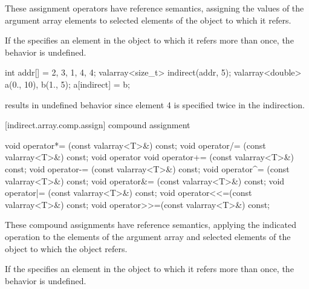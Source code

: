 \begin{itemdescr}
\pnum
These assignment operators have reference semantics, assigning the values
of the argument array elements to selected elements of the
object to which it refers.

\pnum
If the
specifies an element in the
object to which it refers more than once, the behavior is undefined.
%

\pnum
\begin{example}
\begin{codeblock}
int addr[] = {2, 3, 1, 4, 4};
valarray<size_t> indirect(addr, 5);
valarray<double> a(0., 10), b(1., 5);
a[indirect] = b;
\end{codeblock}
results in undefined behavior since element 4 is specified twice in the
indirection.
\end{example}
\end{itemdescr}

[indirect.array.comp.assign]{ compound assignment}

%
%
%
%
%
%
%
%
%
%
\begin{itemdecl}
void operator*= (const valarray<T>&) const;
void operator/= (const valarray<T>&) const;
void operator%
void operator+= (const valarray<T>&) const;
void operator-= (const valarray<T>&) const;
void operator^= (const valarray<T>&) const;
void operator&= (const valarray<T>&) const;
void operator|= (const valarray<T>&) const;
void operator<<=(const valarray<T>&) const;
void operator>>=(const valarray<T>&) const;
\end{itemdecl}

\begin{itemdescr}
\pnum
These compound assignments have reference semantics, applying the indicated
operation to the elements of the argument array and selected elements of the
object to which the
object refers.

\pnum
If the
specifies an element in the
object to which it refers more than once,
the behavior is undefined.
\end{itemdescr}

